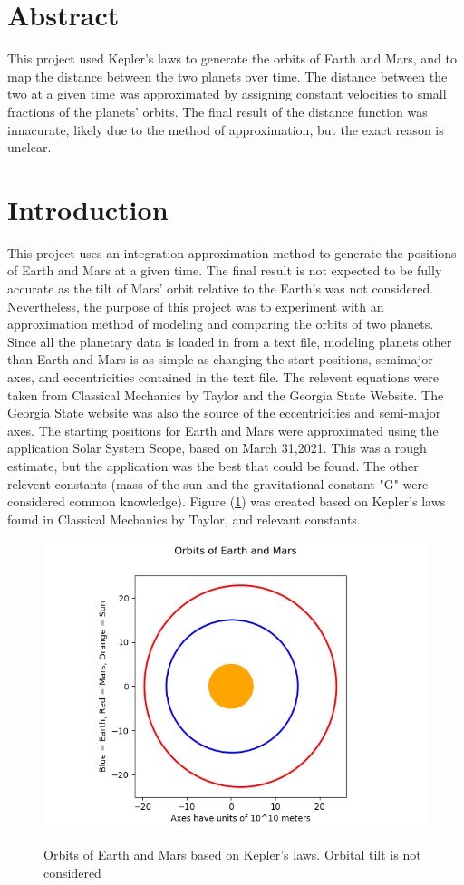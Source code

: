 \section{Abstract}
This project used Kepler's laws to generate the orbits of Earth and Mars, and to map the distance between the two
planets over time. The distance between the two at a given time was approximated by assigning constant velocities to
small fractions of the planets' orbits. The final result of the distance function was innacurate, likely due to the 
method of approximation, but the exact reason is unclear.
\section{Introduction}
This project uses an integration approximation method to generate the positions of Earth and Mars at a given time. 
The final result is not expected to be fully accurate as the tilt of Mars' orbit relative to the Earth's was not 
considered. Nevertheless, the purpose of this project was to experiment with an approximation method of modeling and
comparing the orbits of two planets. Since all the planetary data is loaded in from a text file, modeling planets other than Earth and Mars is as simple as changing the start positions, semimajor axes, and eccentricities contained in the 
text file. 
The relevent equations were taken from Classical Mechanics by Taylor \cite{taylor} and the Georgia State Website. The Georgia State
website was also the source of the eccentricities and semi-major axes. 
The starting positions for Earth and Mars were approximated using the application Solar System Scope, based on March 31,2021.
This was a rough estimate, but the application was the best that could be found. The other relevent constants (mass of
the sun and the gravitational constant "G" were considered common knowledge).
Figure (\ref{OrbitPlot}) was created
based on Kepler's laws found in Classical Mechanics by Taylor, and relevant constants.
\begin{figure}
	\includegraphics[scale = 0.8]{EllipseTest2.png}
	\label{OrbitPlot}
	\caption{Orbits of Earth and Mars based on Kepler's laws. Orbital tilt is not considered}
\end{figure}
